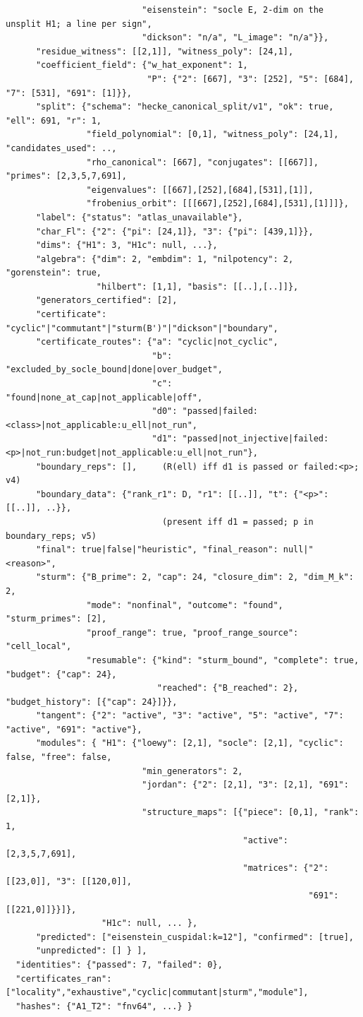 \documentclass[11pt]{article}
\theoremstyle{remark}
\begin{document}
{\begin{verbatim}
                           "eisenstein": "socle E, 2-dim on the unsplit H1; a line per sign",
                           "dickson": "n/a", "L_image": "n/a"}},
      "residue_witness": [[2,1]], "witness_poly": [24,1],
      "coefficient_field": {"w_hat_exponent": 1,
                            "P": {"2": [667], "3": [252], "5": [684], "7": [531], "691": [1]}},
      "split": {"schema": "hecke_canonical_split/v1", "ok": true, "ell": 691, "r": 1,
                "field_polynomial": [0,1], "witness_poly": [24,1], "candidates_used": ..,
                "rho_canonical": [667], "conjugates": [[667]], "primes": [2,3,5,7,691],
                "eigenvalues": [[667],[252],[684],[531],[1]],
                "frobenius_orbit": [[[667],[252],[684],[531],[1]]]},
      "label": {"status": "atlas_unavailable"},
      "char_Fl": {"2": {"pi": [24,1]}, "3": {"pi": [439,1]}},
      "dims": {"H1": 3, "H1c": null, ...},
      "algebra": {"dim": 2, "embdim": 1, "nilpotency": 2, "gorenstein": true,
                  "hilbert": [1,1], "basis": [[..],[..]]},
      "generators_certified": [2],
      "certificate": "cyclic"|"commutant"|"sturm(B')"|"dickson"|"boundary",
      "certificate_routes": {"a": "cyclic|not_cyclic",
                             "b": "excluded_by_socle_bound|done|over_budget",
                             "c": "found|none_at_cap|not_applicable|off",
                             "d0": "passed|failed:<class>|not_applicable:u_ell|not_run",
                             "d1": "passed|not_injective|failed:<p>|not_run:budget|not_applicable:u_ell|not_run"},
      "boundary_reps": [],     (R(ell) iff d1 is passed or failed:<p>; v4)
      "boundary_data": {"rank_r1": D, "r1": [[..]], "t": {"<p>": [[..]], ..}},
                               (present iff d1 = passed; p in boundary_reps; v5)
      "final": true|false|"heuristic", "final_reason": null|"<reason>",
      "sturm": {"B_prime": 2, "cap": 24, "closure_dim": 2, "dim_M_k": 2,
                "mode": "nonfinal", "outcome": "found", "sturm_primes": [2],
                "proof_range": true, "proof_range_source": "cell_local",
                "resumable": {"kind": "sturm_bound", "complete": true, "budget": {"cap": 24},
                              "reached": {"B_reached": 2}, "budget_history": [{"cap": 24}]}},
      "tangent": {"2": "active", "3": "active", "5": "active", "7": "active", "691": "active"},
      "modules": { "H1": {"loewy": [2,1], "socle": [2,1], "cyclic": false, "free": false,
                           "min_generators": 2,
                           "jordan": {"2": [2,1], "3": [2,1], "691": [2,1]},
                           "structure_maps": [{"piece": [0,1], "rank": 1,
                                               "active": [2,3,5,7,691],
                                               "matrices": {"2": [[23,0]], "3": [[120,0]],
                                                            "691": [[221,0]]}}]},
                   "H1c": null, ... },
      "predicted": ["eisenstein_cuspidal:k=12"], "confirmed": [true],
      "unpredicted": [] } ],
  "identities": {"passed": 7, "failed": 0},
  "certificates_ran": ["locality","exhaustive","cyclic|commutant|sturm","module"],
  "hashes": {"A1_T2": "fnv64", ...} }
\end{verbatim}}
\end{document}
